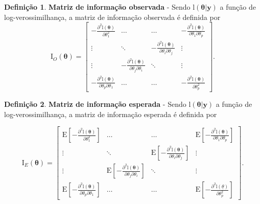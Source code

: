 \documentclass[
  9pt,
  a5paper,
]{book}
\theoremstyle{definition}
\newtheorem{definition}{Definição}[chapter]
\theoremstyle{definition}
\theoremstyle{definition}
\theoremstyle{definition}
\theoremstyle{remark}
\begin{document}
\begin{definition}
\protect\hypertarget{def:IO}{}\label{def:IO}\textbf{Matriz de informação observada} - Sendo \(\mathrm{l}(\boldsymbol{\theta}|\mathbf{y})\) a função de log-verossimilhança, a matriz de informação observada é definida por
\[ \mathrm{I}_O(\boldsymbol{\theta}) = \left[\begin{array}{cccc}
 - \frac{\partial^2 \mathrm{l}(\boldsymbol{\theta})}{\partial \theta_1^2}  & \ldots  &  \ldots & -\frac{\partial^2 \mathrm{l}(\boldsymbol{\theta})}{\partial \theta_1 \partial \theta_p}  \\
                \vdots                                           & \ddots    & - \frac{\partial^2 \mathrm{l}(\boldsymbol{\theta})}{\partial \theta_i \partial \theta_j}& \vdots \\
                \vdots                                           & - \frac{\partial^2 \mathrm{l}(\boldsymbol{\theta})}{\partial \theta_j \partial \theta_i} & \ddots & \vdots \\
- \frac{\partial^2 \mathrm{l}(\boldsymbol{\theta})}{\partial \theta_p \partial \theta_1} & \ldots & \ldots & - \frac{ \partial^2 \mathrm{l}(\boldsymbol{\theta})}{\partial \theta_p^2} 
\end{array}\right]. \]
\end{definition}

\begin{definition}
\protect\hypertarget{def:IE}{}\label{def:IE}\textbf{Matriz de informação esperada} - Sendo \(\mathrm{l}(\boldsymbol{\theta}|\mathbf{y})\) a função de log-verossimilhança, a matriz de informação esperada é definida por

\[ \mathrm{I}_E(\boldsymbol{\theta}) = \left[\begin{array}{cccc}
 \mathrm{E} \left[- \frac{\partial^2 \mathrm{l}(\boldsymbol{\theta})}{\partial \theta_1^2} \right]  & \ldots  &  \ldots & \mathrm{E} \left[-\frac{\partial^2 \mathrm{l}(\boldsymbol{\theta})}{\partial \theta_1 \partial \theta_p}\right]  \\
                \vdots                                           & \ddots    & \mathrm{E} \left[- \frac{\partial^2 \mathrm{l}(\boldsymbol{\theta})}{\partial \theta_i \partial \theta_j} \right]& \vdots \\
                \vdots                                           & \mathrm{E} \left[ - \frac{\partial^2 \mathrm{l}(\boldsymbol{\theta})}{\partial \theta_j \partial \theta_i}\right] & \ddots & \vdots \\
\mathrm{E} \left[- \frac{\partial^2 \mathrm{l}(\boldsymbol{\theta})}{\partial \theta_p \partial \theta_1}\right] & \ldots & \ldots & \mathrm{E} \left[- \frac{ \partial^2 \mathrm{l}(\underline{\theta})}{\partial \theta_p^2}\right] 
\end{array}\right]. \]
\end{definition}
\end{document}
